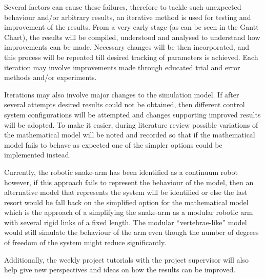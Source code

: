 \documentclass[a4paper,12pt]{report}
\begin{document}
Several factors can cause these failures, therefore to tackle such unexpected behaviour and/or arbitrary results, an iterative method is used for testing and improvement of the results. From a very early stage (as can be seen in the Gantt Chart), the results will be compiled, understood and analysed to understand how improvements can be made. Necessary changes will be then incorporated, and this process will be repeated till desired tracking of parameters is achieved. Each iteration may involve improvements made through educated trial and error methods and/or experiments. 

Iterations may also involve major changes to the simulation model. If after several attempts desired results could not be obtained, then different control system configurations will be attempted and changes supporting improved results will be adopted. To make it easier, during literature review possible variations of the mathematical model will be noted and recorded so that if the mathematical model fails to behave as expected one of the simpler options could be implemented instead.

Currently, the robotic snake-arm has been identified as a continuum robot however, if this approach fails to represent the behaviour of the model, then an alternative model that represents the system will be identified or else the last resort would be fall back on the simplified option for the mathematical model which is the approach of a simplifying the snake-arm as a modular robotic arm with several rigid links of a fixed length. The modular “vertebrae-like” model would still simulate the behaviour of the arm even though the number of degrees of freedom of the system might reduce significantly.

Additionally, the weekly project tutorials with the project supervisor will also help give new perspectives and ideas on how the results can be improved.
\end{document}
